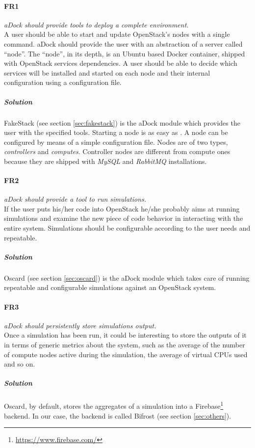 \paragraph{FR1}\label{p:fr1} \emph{aDock should provide tools to deploy a complete environment.} \hfill \\
A user should be able to start and update OpenStack's nodes with a single command. aDock should provide the user with an abstraction of a server called ``node''. The ``node'', in its depth, is an Ubuntu based Docker container, shipped with OpenStack services dependencies. A user should be able to decide which services will be installed and started on each node and their internal configuration using a configuration file.
\subparagraph{Solution} FakeStack (see section \ref{sec:fakestack}) is the aDock module which provides the user with the specified tools. Starting a node is as easy as . A node can be configured by means of a simple configuration file. Nodes are of two types, \textit{controllers} and \textit{computes}. Controller nodes are different from compute ones because they are shipped with \textit{MySQL} and \textit{RabbitMQ} installations.

\paragraph{FR2}\label{p:fr2} \emph{aDock should provide a tool to run simulations.} \hfill \\
If the user puts his/her code into OpenStack he/she probably aims at running simulations and examine the new piece of code behavior in interacting with the entire system. Simulations should be configurable according to the user needs and repeatable.
\subparagraph{Solution} Oscard (see section \ref{sec:oscard}) is the aDock module which takes care of running repeatable and configurable simulations against an OpenStack system.

\paragraph{FR3}\label{p:fr3} \emph{aDock should persistently store simulations output.} \hfill \\
Once a simulation has been run, it could be interesting to store the outputs of it in terms of generic metrics about the system, such as the average of the number of compute nodes active during the simulation, the average of virtual CPUs used and so on.
\subparagraph{Solution} Oscard, by default, stores the aggregates of a simulation into a Firebase\footnote{\url{https://www.firebase.com/}} backend. In our case, the backend is called Bifrost (see section \ref{sec:others}).

